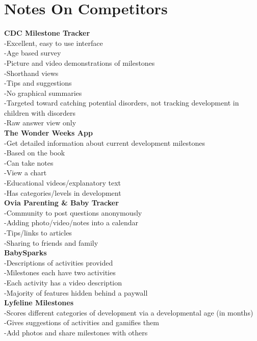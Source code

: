\section{Notes On Competitors}
\textbf{CDC Milestone Tracker}\\
	-Excellent, easy to use interface\\
	-Age based survey\\
	-Picture and video demonstrations of milestones\\
	-Shorthand views\\
	-Tips and suggestions\\
	-No graphical summaries\\
	-Targeted toward catching potential disorders, not tracking development in children with disorders\\
	-Raw answer view only\\

\textbf{The Wonder Weeks App}\\
	-Get detailed information about current development milestones\\
	-Based on the book\\
    -Can take notes\\
	-View a chart\\
	-Educational videos/explanatory text\\
	-Has categories/levels in development\\

\textbf{Ovia Parenting \& Baby Tracker}\\
	-Community to post questions anonymously\\
	-Adding photo/video/notes into a calendar\\
	-Tips/links to articles\\
	-Sharing to friends and family\\

\textbf{BabySparks}\\
	-Descriptions of activities provided\\
	-Milestones each have two activities\\
	-Each activity has a video description\\
	-Majority of features hidden behind a paywall\\

\textbf{Lyfeline Milestones}\\
-Scores different categories of development via a developmental age (in months)\\
-Gives suggestions of activities and gamifies them\\
-Add photos and share milestones with others\\
\label{Competitors}

